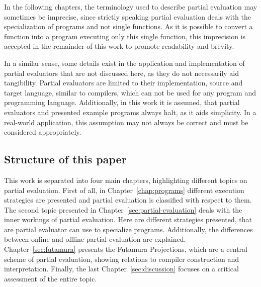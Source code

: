In the following chapters, the terminology used to describe partial evaluation may sometimes be imprecise, since strictly speaking partial evaluation deals with the specialization of programs and not single functions.
As it is possible to convert a function into a program executing only this single function, this imprecision is accepted in the remainder of this work to promote readability and brevity.

In a similar sense, some details exist in the application and implementation of partial evaluators that are not discussed here, as they do not necessarily aid tangibility.
Partial evaluators are limited to their implementation, source and target language, similar to compilers, which can not be used for any program and programming language.
Additionally, in this work it is assumed, that partial evaluators and presented example programs always halt, as it aids simplicity.
In a real-world application, this assumption may not always be correct and must be considered appropriately.

\subsection{Structure of this paper}

This work is separated into four main chapters, highlighting different topics on partial evaluation.
First of all, in Chapter~\ref{chap:programs} different execution strategies are presented and partial evaluation is classified with respect to them.
The second topic presented in Chapter~\ref{sec:partial-evaluation} deals with the inner workings of partial evaluation.
Here are different strategies presented, that are partial evaluator can use to specialize programs.
Additionally, the differences between online and offline partial evaluation are explained.
Chapter~\ref{sec:futamura} presents the Futamura Projections, which are a central scheme of partial evaluation, showing relations to compiler construction and interpretation.
Finally, the last Chapter~\ref{sec:discussion} focuses on a critical assessment of the entire topic.

